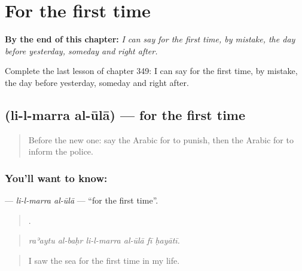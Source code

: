 
\chapter{For the first time}
\label{ch:ar-for-the-first-time}

\begin{chapteropening}
\textbf{By the end of this chapter:} \emph{I can say for the first time, by mistake, the day before yesterday, someday and right after.}

Complete the last lesson of chapter 349: I can say for the first time, by mistake, the day before yesterday, someday and right after.
\end{chapteropening}

\section[\texorpdfstring{\ar{للمرة} \ar{الأولى} (li-l-marra al-ūlā)}{للمرة الأولى (li-l-marra al-ūlā)}]{  (li-l-marra al-ūlā) — for the first time}

\label{lesson:AR-C349-li-l-marra-al-ula}



\begin{quote}
Before the new one: say the Arabic for to punish, then the Arabic for to inform the police.
\end{quote}

\subsection*{You'll want to know:  }
\textbf{ } — \emph{li-l-marra al-ūlā} — \textquotedblleft{}for the first time\textquotedblright{}.

\begin{quote}
     .
\end{quote}

\begin{quote}
\emph{raʾaytu al-baḥr li-l-marra al-ūlā fī ḥayātī.}
\end{quote}

\begin{quote}
I saw the sea for the first time in my life.
\end{quote}

